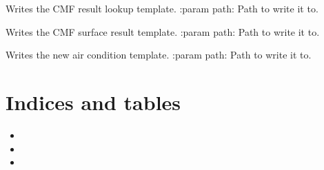 \documentclass[letterpaper,10pt,english]{sphinxmanual}
\begin{document}

\begin{fulllineitems}
\label{\detokenize{lib:livestock.lib.templates.process_cmf_results}}
Writes the CMF result lookup template.
:param path: Path to write it to.

\end{fulllineitems}


\begin{fulllineitems}
\label{\detokenize{lib:livestock.lib.templates.process_cmf_surface_results}}
Writes the CMF surface result template.
:param path: Path to write it to.

\end{fulllineitems}


\begin{fulllineitems}
\label{\detokenize{lib:livestock.lib.templates.new_air_conditions}}
Writes the new air condition template.
:param path: Path to write it to.

\end{fulllineitems}



\chapter{Indices and tables}
\label{\detokenize{index:indices-and-tables}}\begin{itemize}
\item {} 

\item {} 

\item {} 

\end{itemize}
\end{document}
